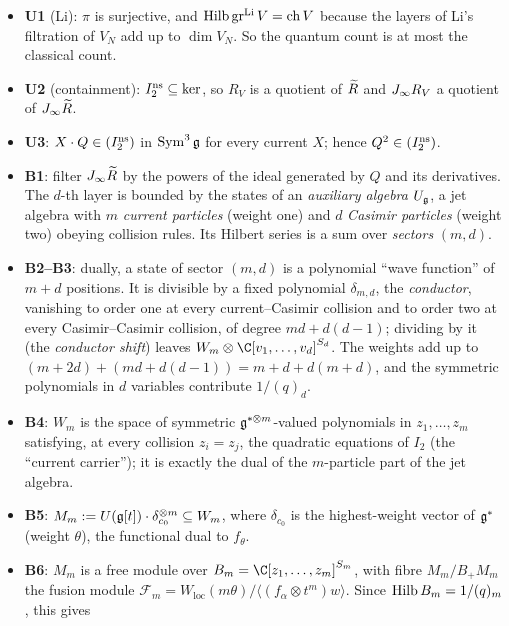 \begin{itemize}
\item \textbf{U1} (Li): $\pi$ is surjective, and $\operatorname{Hilb}\operatorname{gr}^{\mathrm{Li}} V=\operatorname{ch} V$ because the layers of Li's
  filtration of $V_N$ add up to $\dim V_N$. So the quantum count is at most the classical count.
\item \textbf{U2} (containment): $I_2^{\mathrm{ns}}\subseteq\ker$, so $R_V$ is a quotient of $\widetilde R$ and $J_\infty R_V$ a
  quotient of $J_\infty\widetilde R$.
\item \textbf{U3}: $X\cdot Q\in(I_2^{\mathrm{ns}})$ in $\operatorname{Sym}^3\mathfrak g$ for every current $X$; hence $Q^2\in(I_2^{\mathrm{ns}})$.
\item \textbf{B1}: filter $J_\infty\widetilde R$ by the powers of the ideal generated by $Q$ and its derivatives. The $d$-th
  layer is bounded by the states of an \emph{auxiliary algebra} $U_{\mathfrak g}$, a jet algebra with $m$ \emph{current particles}
  (weight one) and $d$ \emph{Casimir particles} (weight two) obeying collision rules. Its Hilbert series is a sum over
  \emph{sectors} $(m,d)$.
\item \textbf{B2--B3}: dually, a state of sector $(m,d)$ is a polynomial ``wave function'' of $m+d$ positions. It is divisible
  by a fixed polynomial $\delta_{m,d}$, the \emph{conductor}, vanishing to order one at every current--Casimir collision and
  to order two at every Casimir--Casimir collision, of degree $md+d(d-1)$; dividing by it (the \emph{conductor shift}) leaves
  $W_m\otimes\C[v_1,\dots,v_d]^{S_d}$. The weights add up to $(m+2d)+(md+d(d-1))=m+d+d(m+d)$, and the symmetric
  polynomials in $d$ variables contribute $1/(q)_d$.
\item \textbf{B4}: $W_m$ is the space of symmetric $\mathfrak g^{*\otimes m}$-valued polynomials in
  $z_1,\dots,z_m$ satisfying, at every collision $z_i=z_j$, the quadratic equations of $I_2$ (the
  ``current carrier''); it is exactly the dual of the $m$-particle part of the jet algebra.
\item \textbf{B5}: $M_m:=U(\mathfrak g[t])\cdot\delta_{c_0}^{\otimes m}\subseteq W_m$, where $\delta_{c_0}$
  is the highest-weight vector of $\mathfrak g^*$ (weight $\theta$), the functional dual to $f_\theta$.
\item \textbf{B6}: $M_m$ is a free module over $B_m=\C[z_1,\dots,z_m]^{S_m}$, with fibre $M_m/B_+M_m$ the fusion module
  $\mathcal F_m=W_{\mathrm{loc}}(m\theta)/\langle(f_\alpha\otimes t^m)w\rangle$. Since $\operatorname{Hilb} B_m=1/(q)_m$, this gives

\end{itemize}
